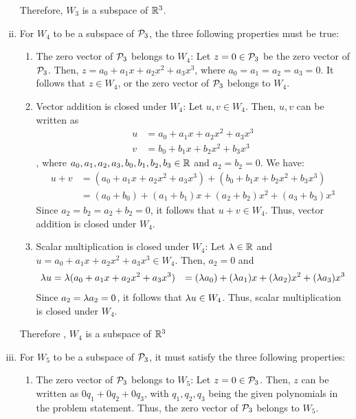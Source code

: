\begin{sol}
\begin{enumerate}[(i)]
        Therefore, $W_3$ is a subspace of $\R^{3}$.
        \item For $W_4$ to be a subspace of $\P_3$, the three following properties must be true:
        \begin{enumerate}[(1)]
            \item The zero vector of $\P_3$ belongs to $W_4$: Let $z=0\in\P_3$ be the zero vector of $\P_3$. Then, $z=a_0+a_1x+a_2x^{2}+a_3x^{3}$, where $a_0=a_1=a_2=a_3=0$. It follows that $z\in W_4$, or the zero vector of $\P_3$ belongs to $W_4$.
            \item Vector addition is closed under $W_4$: Let $u,v\in W_4$. Then, $u, v$ can be written as
            \[
                \begin{aligned}
                    u & = a_0+a_1x+a_2x^{2}+a_3x^{3} \\
                    v & = b_0+b_1x+b_2x^{2}+b_3x^{3}
                \end{aligned}
            \]
            , where $a_0,a_1,a_2,a_3,b_0,b_1,b_2,b_3\in\R$ and $a_2=b_2=0$. We have:
            \[
                \begin{aligned}
                    u+v & = (a_0+a_1x+a_2x^{2}+a_3x^{3})+(b_0+b_1x+b_2x^{2}+b_3x^{3}) \\
                        & = (a_0+b_0)+(a_1+b_1)x+(a_2+b_2)x^{2}+(a_3+b_3)x^{3}
                \end{aligned}
            \]
            Since $a_2=b_2=a_2+b_2=0$, it follows that $u+v\in W_4$. Thus, vector addition is closed under $W_4$.
            \item Scalar multiplication is closed under $W_4$: Let $\lam\in\R$ and $u=a_0+a_1x+a_2x^{2}+a_3x^{3}\in W_4$. Then, $a_2=0$ and
            \[
                \begin{aligned}
                    \lam u & = \lam(a_0+a_1x+a_2x^{2}+a_3x^{3})
                            & = (\lam a_0)+(\lam a_1)x+(\lam a_2)x^{2}+(\lam a_3)x^{3}
                \end{aligned}
            \]
            Since $a_2=\lam a_2=0$, it follows that $\lam u\in W_4$. Thus, scalar multiplication is closed under $W_4$.
        \end{enumerate}
        Therefore , $W_4$ is a subspace of $\R^3$
        \item For $W_5$ to be a subspace of $\P_3$, it must satisfy the three following properties:
        \begin{enumerate}[(1)]
            \item The zero vector of $\P_3$ belongs to $W_5$: Let $z=0\in\P_3$. Then, $z$ can be written as $0q_1+0q_2+0q_3$, with $q_1,q_2,q_3$ being the given polynomials in the problem statement. Thus, the zero vector of $\P_3$ belongs to $W_5$.

\end{enumerate}
\end{enumerate}
\end{sol}
